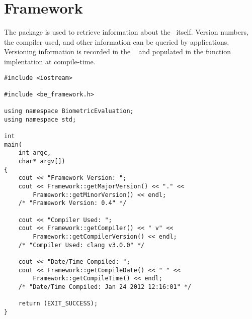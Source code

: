 %
%
\chapter{Framework}
The  package is used to retrieve information about the
\lname\ itself.  Version numbers, the compiler used, and other information
can be queried by applications.  Versioning information is recorded in the
\sname\  and populated in the function implentation at 
compile-time.

\label{chp-framework}

\begin{lstlisting}[caption={Using the \namespace{Framework} API}, label=frameworkuse]
#include <iostream>

#include <be_framework.h>

using namespace BiometricEvaluation;
using namespace std;

int
main(
    int argc,
    char* argv[])
{
	cout << "Framework Version: ";
	cout << Framework::getMajorVersion() << "." <<
	    Framework::getMinorVersion() << endl;
	/* "Framework Version: 0.4" */

	cout << "Compiler Used: ";
	cout << Framework::getCompiler() << " v" <<
	    Framework::getCompilerVersion() << endl;
	/* "Compiler Used: clang v3.0.0" */

	cout << "Date/Time Compiled: ";
	cout << Framework::getCompileDate() << " " <<
	    Framework::getCompileTime() << endl;
	/* "Date/Time Compiled: Jan 24 2012 12:16:01" */

	return (EXIT_SUCCESS);
}
\end{lstlisting}
